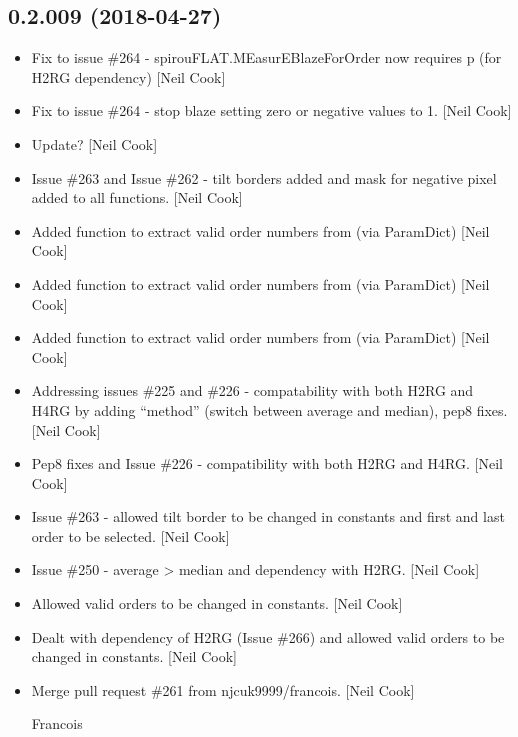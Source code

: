 \documentclass[a4paper,10pt,english]{report}
\begin{document}
\subsection{0.2.009 (2018-04-27)}
\label{\detokenize{misc/changelog:id449}}\begin{itemize}
\item {} 
Fix to issue \#264 - spirouFLAT.MEasurEBlazeForOrder now requires p
(for H2RG dependency) {[}Neil Cook{]}

\item {} 
Fix to issue \#264 - stop blaze setting zero or negative values to 1.
{[}Neil Cook{]}

\item {} 
Update? {[}Neil Cook{]}

\item {} 
Issue \#263 and Issue \#262 - tilt borders added and mask for negative
pixel added to all functions. {[}Neil Cook{]}

\item {} 
Added function to extract valid order numbers from 
(via ParamDict) {[}Neil Cook{]}

\item {} 
Added function to extract valid order numbers from 
(via ParamDict) {[}Neil Cook{]}

\item {} 
Added function to extract valid order numbers from 
(via ParamDict) {[}Neil Cook{]}

\item {} 
Addressing issues \#225 and \#226 - compatability with both H2RG and
H4RG by adding “method” (switch between average and median), pep8
fixes. {[}Neil Cook{]}

\item {} 
Pep8 fixes and Issue \#226 - compatibility with both H2RG and H4RG.
{[}Neil Cook{]}

\item {} 
Issue \#263 - allowed tilt border to be changed in constants and first
and last order to be selected. {[}Neil Cook{]}

\item {} 
Issue \#250 - average \textendash{}\textgreater{} median and dependency with H2RG. {[}Neil Cook{]}

\item {} 
Allowed valid orders to be changed in constants. {[}Neil Cook{]}

\item {} 
Dealt with dependency of H2RG (Issue \#266) and allowed valid orders to
be changed in constants. {[}Neil Cook{]}

\item {} 
Merge pull request \#261 from njcuk9999/francois. {[}Neil Cook{]}

Francois

\end{itemize}
\end{document}
